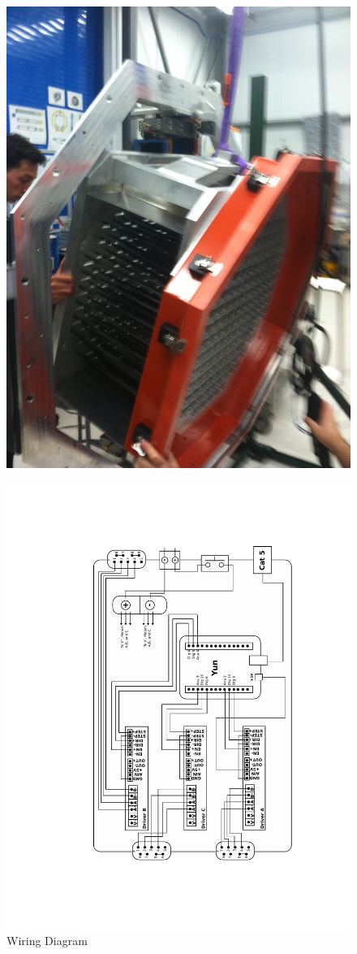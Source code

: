 \documentclass[11pt]{article}
\begin{document}
\begin{figure}[h]
\begin{center}
\includegraphics[width = 5in]{photo_3.png}
\end{center}
\caption{}  
\label{fd2}
\end{figure}

\begin{figure}[h]
\begin{center}
\includegraphics[width = 5in]{wiringDrawing.pdf}
\end{center}
\caption{Wiring Diagram}  
\label{fd2}
\end{figure}
\end{document}
